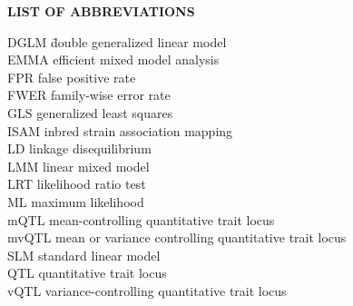 {}

\begin{center}
{\large \textbf{LIST OF ABBREVIATIONS}}
\end{center}

\newcommand{\Ab}[2]{\noindent  #1 \> #2 \\}
\newcommand{\Abi}[2]{\noindent #1 \hspace{1.5cm} \= #2 \\}

\begin{tabbing}
\Abi{DGLM}{double generalized linear model}
\Ab{EMMA}{efficient mixed model analysis}
\Ab{FPR}{false positive rate}
\Ab{FWER}{family-wise error rate}
\Ab{GLS}{generalized least squares}
\Ab{ISAM}{inbred strain association mapping}
\Ab{LD}{linkage disequilibrium}
\Ab{LMM}{linear mixed model}
\Ab{LRT}{likelihood ratio test}
\Ab{ML}{maximum likelihood}
\Ab{mQTL}{mean-controlling quantitative trait locus}
\Ab{mvQTL}{mean or variance controlling quantitative trait locus}
\Ab{SLM}{standard linear model}
\Ab{QTL}{quantitative trait locus}
\Ab{vQTL}{variance-controlling quantitative trait locus}
\end{tabbing}

\clearpage
